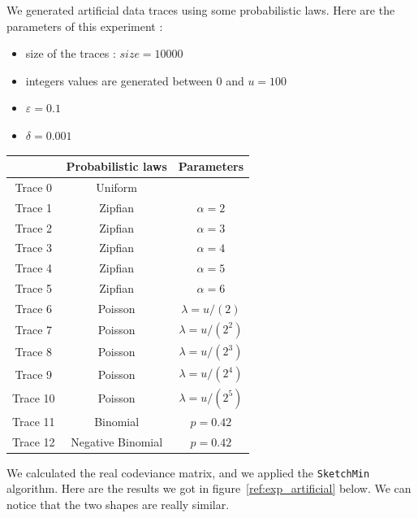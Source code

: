 \documentclass[a4paper]{article}%
\begin{document}
We generated artificial data traces using some probabilistic laws. Here are the parameters of this experiment :
\begin{itemize}
	\item size of the traces : $size = 10 000$
	\item integers values are generated between $0$ and $u = 100$
	\item $\varepsilon = 0.1$
	\item $\delta = 0.001$
\end{itemize}

\begin{center}
	\begin{tabular}{|c|c|c|}
		\hline
		 & Probabilistic laws & Parameters \\
		 \hline
		Trace 0 & Uniform & \\
		Trace 1 & Zipfian & $\alpha = 2$ \\
		Trace 2 & Zipfian & $\alpha = 3$ \\
		Trace 3 & Zipfian & $\alpha = 4$ \\
		Trace 4 & Zipfian & $\alpha = 5$ \\ 
		Trace 5 & Zipfian & $\alpha = 6$ \\
		Trace 6 & Poisson & $\lambda = u/(2)$ \\
		Trace 7 & Poisson & $\lambda = u/(2^2)$ \\
		Trace 8 & Poisson & $\lambda = u/(2^3)$ \\
		Trace 9 & Poisson & $\lambda = u/(2^4)$ \\
		Trace 10 & Poisson & $\lambda = u/(2^5)$ \\
		Trace 11 & Binomial & $p = 0.42$ \\
		Trace 12 & Negative Binomial & $p = 0.42$ \\
		\hline
	\end{tabular}
\end{center}


We calculated the real codeviance matrix, and we applied the \texttt{SketchMin} algorithm. Here are the results we got in figure~\ref{ref:exp_artificial} below. We can notice that the two shapes are really similar.
\end{document}
